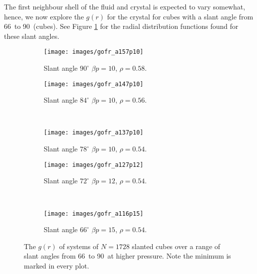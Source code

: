 \documentclass[thesis]{subfiles}
\begin{document}
The first neighbour shell of the fluid and crystal is expected to vary somewhat, hence, we now explore the $g(r)$ for the crystal for cubes with a slant angle from 66\degr\ to 90\degr\ (cubes). See Figure \ref{fig:gofr_Xtal} for the radial distribution functions found for these slant angles. %

\begin{figure}[H]
	\centering
	\begin{subfigure}{0.49\textwidth}
	\texttt{[image: images/gofr\_a157p10]}
	\caption{Slant angle $90^\circ$ $\beta p = 10$, $\rho = 0.58$. }
	\end{subfigure}
	\begin{subfigure}{0.49\textwidth}
		\texttt{[image: images/gofr\_a147p10]}
		\caption{Slant angle $84^\circ$ $\beta p = 10$, $\rho = 0.56$. }
	\end{subfigure}
\\\vspace{10pt}
	\begin{subfigure}{0.49\textwidth}
		\texttt{[image: images/gofr\_a137p10]}
		\caption{Slant angle $78^\circ$ $\beta p = 10$, $\rho = 0.54$. }
	\end{subfigure}
	\begin{subfigure}{0.49\textwidth}
		\texttt{[image: images/gofr\_a127p12]}
		\caption{Slant angle $72^\circ$ $\beta p = 12$, $\rho = 0.54$. }
	\end{subfigure}
\\\vspace{10pt}
	\begin{subfigure}{0.49\textwidth}
		\texttt{[image: images/gofr\_a116p15]}
		\caption{Slant angle $66^\circ$ $\beta p = 15$, $\rho = 0.54$. }
	\end{subfigure}
	
	\caption{The $g(r)$ of systems of $N = 1728$ slanted cubes over a range of slant angles from 66\degr\ to 90\degr\ at higher pressure. Note the minimum is marked in every plot.}\label{fig:gofr_Xtal}
\end{figure}
\end{document}
